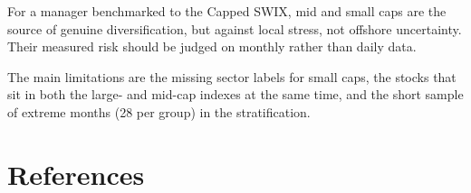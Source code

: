 \documentclass[11pt,preprint]{elsarticle}
\numberwithin{equation}{section}
\numberwithin{figure}{section}
\numberwithin{table}{section}
\begin{document}
For a manager benchmarked to the Capped SWIX, mid and small caps are the
source of genuine diversification, but against local stress, not
offshore uncertainty. Their measured risk should be judged on monthly
rather than daily data.

The main limitations are the missing sector labels for small caps, the
stocks that sit in both the large- and mid-cap indexes at the same time,
and the short sample of extreme months (28 per group) in the
stratification.

\newpage

\section*{References}\label{references}

\protect{}\label{refs}


\end{document}
